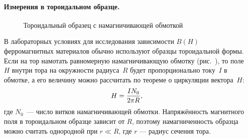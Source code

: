 

\paragraph{Измерения в тороидальном образце.}

\begin{wrapfigure}{o}{0.4\textwidth}
    \caption{Тороидальный образец с намагничивающей обмоткой}
\end{wrapfigure}

В лабораторных условиях для исследования зависимости $B(H)$ ферромагнитных
материалов обычно используют образцы тороидальной формы. Если на тор намотать
равномерную намагничивающую обмотку (рис.~), то поле~$H$ внутри
тора на окружности радиуса~$R$ будет пропорционально току~$I$ в обмотке, а его
величину можно рассчитать по теореме о циркуляции вектора~$H$:
\begin{equation}
    \eqmark{H-toroid}
    H = \frac{IN_0}{2\pi R},
\end{equation}
где $N_0$~--- число витков намагничивающей обмотки. Напряжённость магнитного
поля в тороидальном образце зависит от $R$, поэтому
намагниченность образца можно считать однородной при $r \ll R$, где $r$ ---
радиус сечения тора.

